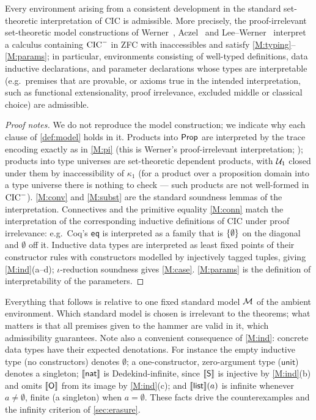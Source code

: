 \begin{proposition}[Existence]
\label{prop:model-exists}
Every environment arising from a consistent development in the
standard set-theoretic interpretation of CIC is admissible.  More
precisely, the proof-irrelevant set-theoretic model constructions of
Werner~\cite{Werner1997}, Aczel~\cite{Aczel1998} and
Lee--Werner~\cite{LeeWerner2011} interpret a calculus containing
$\mathrm{CIC}^{-}$ in ZFC with inaccessibles and satisfy
\ref{M:typing}--\ref{M:params}; in particular, environments
consisting of well-typed definitions, data inductive declarations,
and parameter declarations whose types are interpretable (e.g.\
premises that are provable, or axioms true in the intended
interpretation, such as functional extensionality, proof
irrelevance, excluded middle or classical choice) are admissible.
\end{proposition}

\begin{proof}[Proof notes]
We do not reproduce the model construction; we indicate why each
clause of \cref{def:model} holds in it.  Products into $\mathsf{Prop}$ are
interpreted by the trace encoding exactly as in \ref{M:pi} (this is
Werner's proof-irrelevant interpretation; \cite{Werner1997,
LeeWerner2011}); products into type universes are set-theoretic
dependent products, with $\mathcal{U}_1$ closed under them by inaccessibility
of $\kappa_1$ (for a product over a proposition domain into a type
universe there is nothing to check --- such products are not
well-formed in $\mathrm{CIC}^{-}$).  \ref{M:conv} and \ref{M:subst} are the
standard soundness lemmas of the interpretation.  Connectives and the
primitive equality \ref{M:conn} match the interpretation of the
corresponding inductive definitions of CIC under proof irrelevance:
e.g.\ Coq's \texttt{eq} is interpreted as a family that is $\{\emptyset\}$
on the diagonal and $\emptyset$ off it.  Inductive data types are
interpreted as least fixed points of their constructor rules with
constructors modelled by injectively tagged tuples, giving
\ref{M:ind}(a--d); $\iota$-reduction soundness gives \ref{M:case}.
\ref{M:params} is the definition of interpretability of the
parameters.
\end{proof}

\begin{remark}
\label{rem:model-choice}
Everything that follows is relative to one fixed standard model
$\mathcal{M}$ of the ambient environment.  Which standard model is chosen is
irrelevant to the theorems; what matters is that all premises given
to the hammer are valid in it, which admissibility guarantees.  Note
also a convenient consequence of \ref{M:ind}: concrete data types
have their expected denotations.  For instance the empty inductive
type (no constructors) denotes $\emptyset$; a one-constructor,
zero-argument type ($\mathsf{unit}$) denotes a singleton;
$[\![ \mathsf{nat} ]\!]$ is Dedekind-infinite, since
$[\![ \mathsf{S} ]\!]$ is injective by \ref{M:ind}(b) and omits
$[\![ \mathsf{O} ]\!]$ from its image by \ref{M:ind}(c); and
$[\![ \mathsf{list} ]\!](a) $ is infinite whenever $a \neq \emptyset$,
finite (a singleton) when $a = \emptyset$.  These facts drive the
counterexamples and the infinity criterion of \cref{sec:erasure}.
\end{remark}
